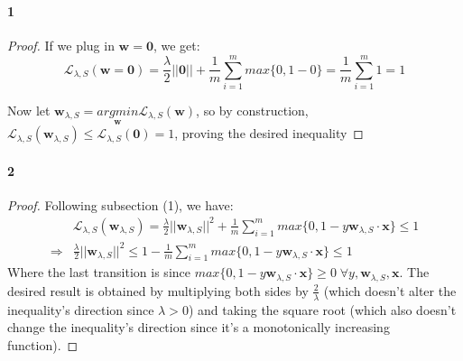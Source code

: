 \subsubsection{}
\paragraph{1}
\begin{proof}    
    If we plug in $\boldsymbol{w}=\boldsymbol{0}$, we get:
    \begin{equation*}
        \mathcal{L}_{\lambda, S}(\boldsymbol{w=0}) = \frac{\lambda}{2}||\boldsymbol{0}|| 
        + \frac{1}{m} \sum_{i=1}^{m} max\{0, 1-0\} = \frac{1}{m} \sum_{i=1}^{m} 1 = 1
    \end{equation*}
    
    Now let $\boldsymbol{w}_{\lambda, S} = \underset{\boldsymbol{w}}{argmin} \mathcal{L}_{\lambda, S}(\boldsymbol{w})$, so by construction, $\mathcal{L}_{\lambda, S}(\boldsymbol{w}_{\lambda, S}) \leq \mathcal{L}_{\lambda, S}(\boldsymbol{0}) = 1$, proving the desired inequality
\end{proof}

\paragraph{2}
\begin{proof}
    Following subsection (1), we have:
    \begin{equation*}
        \begin{split}            
            & \mathcal{L}_{\lambda, S}(\boldsymbol{w}_{\lambda, S}) = \frac{\lambda}{2}||\boldsymbol{w}_{\lambda, S}||^2 
            + \frac{1}{m} \sum_{i=1}^{m} max\{0, 1-y \boldsymbol{w}_{\lambda, S} \cdot \boldsymbol{x}\} \leq 1 \\
            \Rightarrow & \frac{\lambda}{2}||\boldsymbol{w}_{\lambda, S}||^2 \leq 1 - \frac{1}{m} \sum_{i=1}^{m} max\{0, 1-y \boldsymbol{w}_{\lambda, S} \cdot \boldsymbol{x}\} \leq 1
        \end{split}
    \end{equation*}
    Where the last transition is since $max\{0, 1-y \boldsymbol{w}_{\lambda, S} \cdot \boldsymbol{x}\} \geq 0 \; \forall y, \boldsymbol{w}_{\lambda, S}, \boldsymbol{x}$. The desired result is obtained by multiplying both sides by $\frac{2}{\lambda}$ (which doesn't alter the inequality's direction since $\lambda > 0$) and taking the square root (which also doesn't change the inequality's direction since it's a monotonically increasing function).
\end{proof}

